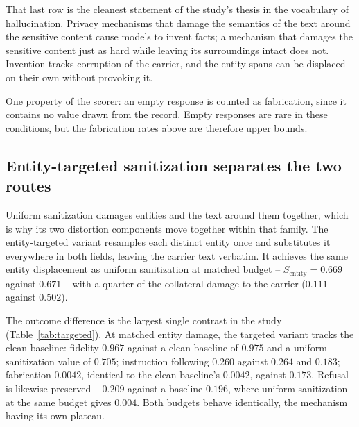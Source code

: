 That last row is the cleanest statement of the study's thesis in the vocabulary of hallucination.
Privacy mechanisms that damage the semantics of the text around the sensitive content cause models to invent facts;
a mechanism that damages the sensitive content just as hard while leaving its surroundings intact does not.
Invention tracks corruption of the carrier,
and the entity spans can be displaced on their own without provoking it.

One property of the scorer:
an empty response is counted as fabrication,
since it contains no value drawn from the record.
Empty responses are rare in these conditions,
but the fabrication rates above are therefore upper bounds.

\subsection{\label{apx:targeted}Entity-targeted sanitization separates the two routes}
Uniform sanitization damages entities and the text around them together,
which is why its two distortion components move together within that family.
The entity-targeted variant resamples each distinct entity once and substitutes it everywhere in both fields,
leaving the carrier text verbatim.
It achieves the same entity displacement as uniform sanitization at matched budget -- $S_{\text{entity}} = 0.669$ against $0.671$ -- with a quarter of the collateral damage to the carrier ($0.111$ against $0.502$).

The outcome difference is the largest single contrast in the study (Table~\ref{tab:targeted}).
At matched entity damage,
the targeted variant tracks the clean baseline:
fidelity $0.967$ against a clean baseline of $0.975$ and a uniform-sanitization value of $0.705$;
instruction following $0.260$ against $0.264$ and $0.183$;
fabrication $0.0042$,
identical to the clean baseline's $0.0042$,
against $0.173$.
Refusal is likewise preserved -- $0.209$ against a baseline $0.196$,
where uniform sanitization at the same budget gives $0.004$.
Both budgets behave identically,
the mechanism having its own plateau.

